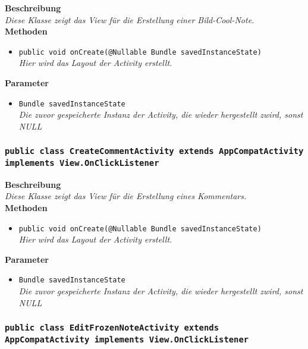 	\textbf{Beschreibung} \\
	\textit{Diese Klasse zeigt das View für die Erstellung einer Bild-Cool-Note.} \\

	\textbf{Methoden}
	\begin{itemize}
		\item\texttt{{public void onCreate(@Nullable Bundle savedInstanceState)}}\\
	\textit{Hier wird das Layout der Activity erstellt.}\\
	\end{itemize}

	\textbf{Parameter}
	\begin{itemize}
		\item\texttt{Bundle savedInstanceState}\\ 
	\textit{Die zuvor gespeicherte Instanz der Activity, die wieder hergestellt zwird, sonst NULL}\\
	\end{itemize} 

\subsubsection{\texttt{public class CreateCommentActivity extends AppCompatActivity implements View.OnClickListener}}

	\textbf{Beschreibung} \\
	\textit{Diese Klasse zeigt das View für die Erstellung eines Kommentars.} \\

	\textbf{Methoden}
	\begin{itemize}
		\item\texttt{{public void onCreate(@Nullable Bundle savedInstanceState)}}\\
	\textit{Hier wird das Layout der Activity erstellt.}\\
	\end{itemize}

	\textbf{Parameter}
	\begin{itemize}
		\item\texttt{Bundle savedInstanceState}\\  
	\textit{Die zuvor gespeicherte Instanz der Activity, die wieder hergestellt zwird, sonst NULL}\\
	\end{itemize} 


\subsubsection{\texttt{public class EditFrozenNoteActivity extends AppCompatActivity implements View.OnClickListener}}

